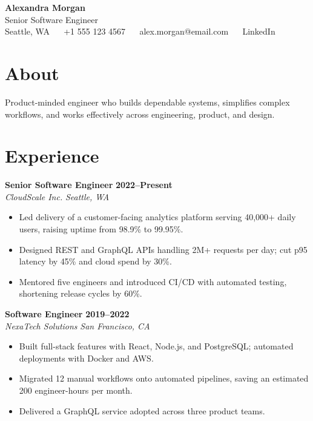 \documentclass[10pt,letterpaper]{article}
\begin{document}
\begin{flushleft}{\fontsize{26}{30}\selectfont\bfseries Alexandra Morgan}\\[4pt]
{\large Senior Software Engineer}\\[5pt]
\small Seattle, WA $\quad$ +1 555 123 4567 $\quad$ alex.morgan@email.com $\quad$ LinkedIn\end{flushleft}

\section{About}
\noindent Product-minded engineer who builds dependable systems, simplifies complex workflows, and works effectively across engineering, product, and design.

\section{Experience}
\noindent\textbf{Senior Software Engineer} \hfill \textbf{2022--Present}\\
\textit{CloudScale Inc.} \hfill \textit{Seattle, WA}\\[2pt]
\begin{itemize}
\item Led delivery of a customer-facing analytics platform serving 40,000+ daily users, raising uptime from 98.9\% to 99.95\%.
\item Designed REST and GraphQL APIs handling 2M+ requests per day; cut p95 latency by 45\% and cloud spend by 30\%.
\item Mentored five engineers and introduced CI/CD with automated testing, shortening release cycles by 60\%.
\end{itemize}
\vspace{5pt}
\noindent\textbf{Software Engineer} \hfill \textbf{2019--2022}\\
\textit{NexaTech Solutions} \hfill \textit{San Francisco, CA}\\[2pt]
\begin{itemize}
\item Built full-stack features with React, Node.js, and PostgreSQL; automated deployments with Docker and AWS.
\item Migrated 12 manual workflows onto automated pipelines, saving an estimated 200 engineer-hours per month.
\item Delivered a GraphQL service adopted across three product teams.
\end{itemize}
\vspace{5pt}
\end{document}
